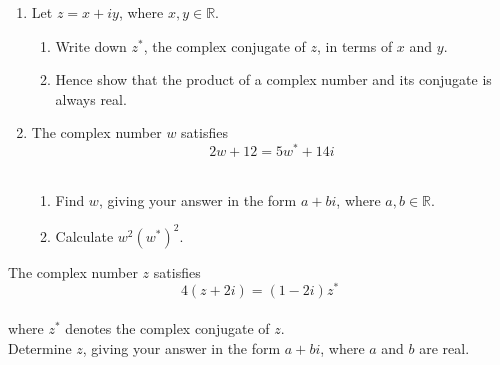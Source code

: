 \documentclass[leqno]{article}
\begin{document}
\djsFrontMatter
\begin{enumerate}[
  label=\textbf{\arabic*.},
  leftmargin=*,
  topsep=0pt,
  partopsep=0pt,
  parsep=0pt
]

\questionitem

\begin{enumerate}[label=\textbf{(\alph*)}]
\item Let $z=x+iy$, where $x,y\in\mathbb{R}$. \\
\begin{enumerate}[label=(\roman*)]
\item Write down $z^*$, the complex conjugate of $z$, in terms of $x$ and $y$.  \\
\item Hence show that the product of a complex number and its conjugate is always real.  \\
\end{enumerate}
\item The complex number $w$ satisfies
\[
2w+12=5w^*+14i
\] \\
\begin{enumerate}[label=(\roman*)]
\item Find $w$, giving your answer in the form $a+bi$, where $a,b\in\mathbb{R}$.  \\
\item Calculate $w^2(w^*)^2$.  \\
\end{enumerate}
\end{enumerate}

\newpage

\questionitem

The complex number $z$ satisfies
\[
4(z+2i)=(1-2i)z^*
\] \\
where $z^*$ denotes the complex conjugate of $z$. \\
Determine $z$, giving your answer in the form $a+bi$, where $a$ and $b$ are real.  \\

\newpage

\questionitem


\end{enumerate}
\end{document}
